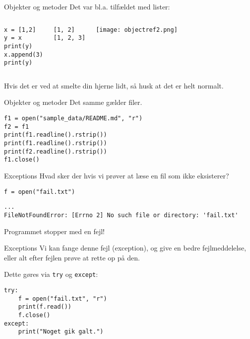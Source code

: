 \begin{frame}[fragile]{Objekter og metoder}
Det var bl.a. tilfældet med lister:

\begin{columns}
	\begin{lstlisting}[style=python]
x = [1,2]
y = x
print(y)
x.append(3)
print(y)
	\end{lstlisting}
	
	\pause
	
	\begin{lstlisting}[style=python]
[1, 2]
[1, 2, 3]
	\end{lstlisting}
	\texttt{[image: objectref2.png]}
	
\end{columns}

\pause

Hvis det er ved at smelte din hjerne lidt, så husk at det er helt normalt.
\end{frame}

\begin{frame}[fragile]{Objekter og metoder}
Det samme gælder filer.

	\begin{lstlisting}[style=python]
f1 = open("sample_data/README.md", "r")
f2 = f1
print(f1.readline().rstrip())
print(f1.readline().rstrip())
print(f2.readline().rstrip())
f1.close()
	\end{lstlisting}

\end{frame}


\begin{frame}[fragile]{Exceptions}
Hvad sker der hvis vi prøver at læse en fil som ikke eksisterer?

\begin{lstlisting}[style=python]
f = open("fail.txt")
\end{lstlisting}

\pause

\begin{lstlisting}[style=python]
...
FileNotFoundError: [Errno 2] No such file or directory: 'fail.txt'
\end{lstlisting}

Programmet stopper med en fejl!

\end{frame}


\begin{frame}[fragile]{Exceptions}
	Vi kan fange denne fejl (exception), og give en bedre fejlmeddelelse, eller alt efter fejlen prøve at rette op på den.
	
	Dette gøres via \texttt{try} og \texttt{except}:
	\begin{lstlisting}[style=python]
try:
	f = open("fail.txt", "r")
	print(f.read())
	f.close()
except:
	print("Noget gik galt.")
	\end{lstlisting}
\end{frame}

